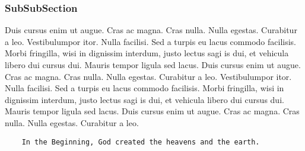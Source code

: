 \documentclass[letterpaper,12pt,oneside]{utexas-dissertation}
\begin{document}
\subsubsection{SubSubSection}
Duis cursus enim ut augue. Cras ac magna. Cras nulla. Nulla egestas. Curabitur a leo. 
Vestibulumpor itor. Nulla facilisi. Sed a turpis eu lacus commodo facilisis. Morbi fringilla, wisi in dignissim interdum, justo lectus sagi is dui, et vehicula libero dui cursus dui. Mauris tempor ligula sed lacus. Duis cursus enim ut augue. Cras ac magna. Cras nulla. Nulla egestas. Curabitur a leo.  
Vestibulumpor itor. Nulla facilisi. Sed a turpis eu lacus commodo facilisis. Morbi fringilla, wisi in dignissim interdum, justo lectus sagi is dui, et vehicula libero dui cursus dui. Mauris tempor ligula sed lacus. Duis cursus enim ut augue. Cras ac magna. Cras nulla. Nulla egestas. Curabitur a leo.   

\begin{verbatim}
    In the Beginning, God created the heavens and the earth.
\end{verbatim}

\backmatter
\end{document}
